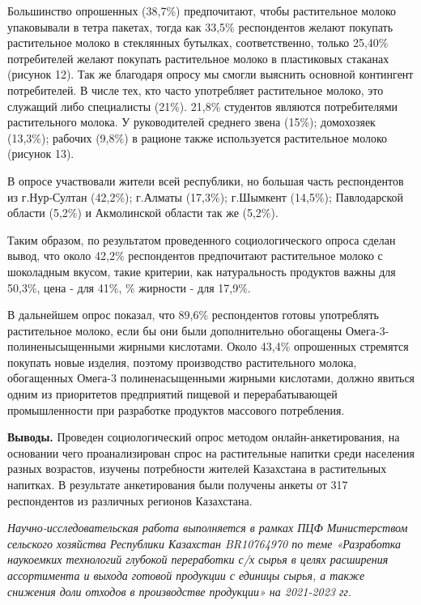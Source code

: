 \begin{multicols}{2}
Большинство опрошенных (38,7\%) предпочитают, чтобы растительное молоко
упаковывали в тетра пакетах, тогда как 33,5\% респондентов желают
покупать растительное молоко в стеклянных бутылках, соответственно,
только 25,40\% потребителей желают покупать растительное молоко в
пластиковых стаканах (рисунок 12).
Так же благодаря опросу мы смогли выяснить основной контингент
потребителей. В числе тех, кто часто употребляет растительное молоко,
это служащий либо специалисты (21\%). 21,8\% студентов являются
потребителями растительного молока. У руководителей среднего звена
(15\%); домохозяек (13,3\%); рабочих (9,8\%) в рационе также
используется растительное молоко (рисунок 13).

В опросе участвовали жители всей республики, но большая часть
респондентов из г.Нур-Султан (42,2\%); г.Алматы (17,3\%); г.Шымкент
(14,5\%); Павлодарской области (5,2\%) и Акмолинской области так же
(5,2\%).

Таким образом, по результатом проведенного социологического опроса
сделан вывод, что около 42,2\% респондентов предпочитают растительное
молоко с шоколадным вкусом, такие критерии, как натуральность продуктов
важны для 50,3\%, цена - для 41\%, \% жирности - для 17,9\%.

В дальнейшем опрос показал, что 89,6\% респондентов готовы употреблять
растительное молоко, если бы они были дополнительно обогащены
Омега-3-полиненысыщенными жирными кислотами. Около 43,4\% опрошенных
стремятся покупать новые изделия, поэтому производство растительного
молока, обогащенных Омега-3 полиненасыщенными жирными кислотами, должно
явиться одним из приоритетов предприятий пищевой и перерабатывающей
промышленности при разработке продуктов массового потребления.

{\bfseries Выводы.} Проведен социологический опрос методом
онлайн-анкетирования, на основании чего проанализирован спрос на
растительные напитки среди населения разных возрастов, изучены
потребности жителей Казахстана в растительных напитках. В результате
анкетирования были получены анкеты от 317 респондентов из различных
регионов Казахстана.
\end{multicols}

\emph{Научно-исследовательская работа выполняется в рамках ПЦФ
Министерством сельского хозяйства Республики Казахстан BR10764970 по
теме «Разработка наукоемких технологий глубокой переработки с/х сырья в
целях расширения ассортимента и выхода готовой продукции с единицы
сырья, а также снижения доли отходов в производстве продукции» на
2021-2023 гг}.

